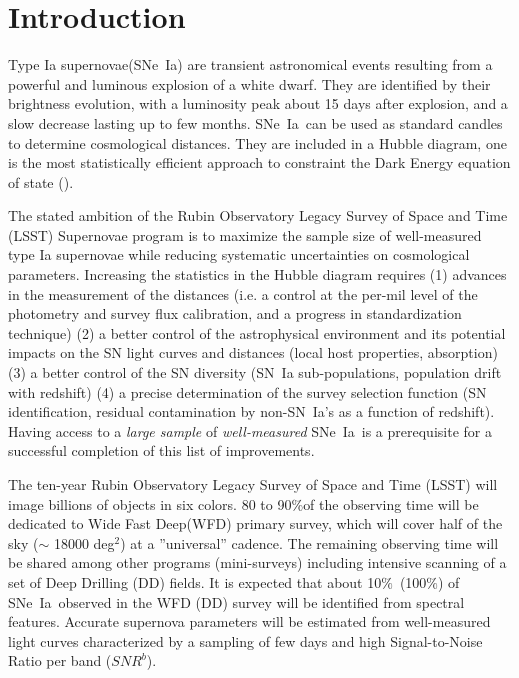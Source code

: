 \documentclass[skiphelvet,twocolumn]{aastex63}
\newcommand{\snrb}{\mbox{$SNR^b$}}
\newcommand{\sne}{{SNe~Ia}}
\newcommand{\degsq}{{deg$^2$}}
\newcommand{\per}{$\%$}
\begin{document}


\section{Introduction}
\label{sec:intro}
Type Ia supernovae(\sne) are transient astronomical events resulting from a powerful and luminous explosion of a white dwarf. They are identified by their brightness evolution, with a luminosity peak about 15 days after explosion, and a slow decrease lasting up to few months. \sne~can be used as standard candles to determine cosmological distances. They are included in a Hubble diagram, one is the most statistically efficient approach to constraint the Dark Energy equation of state (\citealt{Betoule_2014,Scolnic_2018}).
\par
The stated ambition of the Rubin Observatory Legacy Survey of Space and Time (LSST) Supernovae program is to maximize the sample size of well-measured type Ia supernovae while reducing systematic uncertainties on cosmological parameters. Increasing the statistics in the Hubble diagram requires (1) advances in the measurement of the distances (i.e.  a control at the per-mil level of the photometry and survey flux calibration, and a progress in standardization technique) (2) a better control of the astrophysical environment and its potential impacts on the SN light curves and distances (local host properties, absorption) (3) a better control of the SN diversity (SN~Ia sub-populations, population drift with redshift) (4) a precise determination of the survey selection function (SN identification, residual contamination by non-SN~Ia's as a function of redshift). Having access to a {\it large sample} of {\it well-measured} \sne~is a prerequisite for a successful completion of this list of improvements.
\par
The ten-year Rubin Observatory Legacy Survey of Space and Time (LSST) will image billions of objects in six colors. 80 to 90\per of the observing time will be dedicated to Wide Fast Deep(WFD) primary survey, which will cover half of the sky ($\sim$ 18000 \degsq) at a ''universal'' cadence. The remaining observing time will be shared among other programs (mini-surveys) including intensive scanning of a set of Deep Drilling (DD) fields. It is expected that about 10\per~(100\per) of \sne~observed in the WFD (DD) survey will be identified from spectral features. Accurate supernova parameters will be estimated from well-measured light curves characterized by a sampling of few days and high Signal-to-Noise Ratio per band (\snrb).  %
\end{document}
